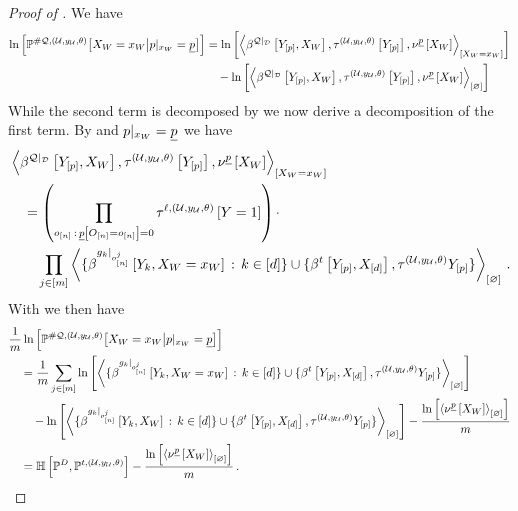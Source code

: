 \begin{proof}[Proof of ]
    We have
    \begin{align*}
        \lnof{\condprobwrtof{\folhlnparameters}{\indexedworldvariables}{\groundingof{\impformula}=\fixedimpformula}}
        &= \lnof{\contractionof{
            \bencodingofat{\restfolformulaset}{\headvariables,\worldvariables},\hypercoreofat{\hybridparam}{\headvariables},\fixedimpbm
        }{\indexedworldvariables}} \\
        &\quad - \lnof{\contraction{
            \bencodingofat{\restfolformulaset}{\headvariables,\worldvariables},\hypercoreofat{\hybridparam}{\headvariables},\fixedimpbm
        }}
    \end{align*}
    While the second term is decomposed by  we now derive a decomposition of the first term.
    By  and ${p}|_{x_{W}}=\underline{p}$ we have
    \begin{align*}
        &\contractionof{
            \bencodingofat{\restfolformulaset}{\headvariables,\worldvariables},\hypercoreofat{\hybridparam}{\headvariables},\fixedimpbm
        }{\indexedworldvariables} \\
        &\quad =
        \left(\prod_{\shortindindices\wcols\fixedimpformulaat{\indexedshortindvariables}=0} \hypercoreofat{\selindex,\hybridparam}{\headvariable=1}\right)
        \cdot \\
        &\quad\quad \prod_{\datindexin}
        \contraction{
            \{\bencodingofat{\groundingofwrt{\extformulaof{\atomenumerator}}{\sampleind}}{\headvariableof{\atomenumerator},\indexedworldvariables} \wcols \atomenumeratorin \}
            \cup \{\hlnstatccwith,\hypercoreof{\hybridparam}{\headvariables}\}
        } \, .
    \end{align*}
    With  we then have
    \begin{align*}
        &\frac{1}{\datanum}\lnof{\condprobwrtof{\folhlnparameters}{\indexedworldvariables}{\groundingof{\impformula}=\fixedimpformula}} \\
        &\quad= \frac{1}{\datanum}\sum_{\datindexin} \lnof{\contraction{
            \{\bencodingofat{\groundingofwrt{\extformulaof{\atomenumerator}}{\sampleind}}{\headvariableof{\atomenumerator},\indexedworldvariables} \wcols \atomenumeratorin \}
            \cup \{\hlnstatccwith,\hypercoreof{\hybridparam}{\headvariables}\}
        }} \\
        &\quad\quad - \lnof{\contraction{
            \{\bencodingofat{\groundingofwrt{\extformulaof{\atomenumerator}}{\sampleind}}{\headvariableof{\atomenumerator},\worldvariables} \wcols \atomenumeratorin \}
            \cup \{\hlnstatccwith,\hypercoreof{\hybridparam}{\headvariables}\}
        }} - \frac{\lnof{\contraction{\fixedimpbm}}}{\datanum} \\
        &\quad = \centropyof{\empdistribution}{\probof{\hlnparameters}} - \frac{\lnof{\contraction{\fixedimpbm}}}{\datanum} \, . \qedhere
    \end{align*}
\end{proof}


